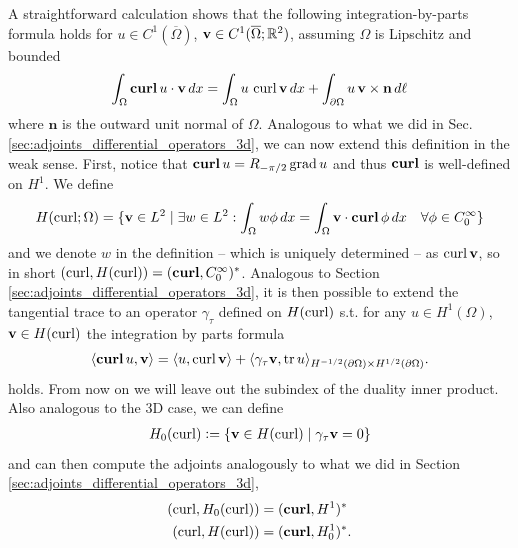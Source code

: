 \documentclass[../master_thesis.tex]{subfiles}
\begin{document}
A straightforward calculation shows that the following integration-by-parts formula 
holds for $u \in C^1(\overline{\Omega})$, $\mathbf{v} \in C^1(\overline{\Omega};\real^2)$,
assuming $\Omega$ is Lipschitz and bounded
\begin{align}
    \int_\Omega \veccurl u \cdot \mathbf{v} \,dx 
    = \int_\Omega u \, \curl \mathbf{v} \, dx + \int_{\partial \Omega} u\, \mathbf{v} \times \mathbf{n} \, d\ell
    \label{eq:2D_integration_by_parts_curl}
\end{align}
where $\mathbf{n}$ is the outward unit normal of $\Omega$.
Analogous to what we did in Sec.\,\ref{sec:adjoints_differential_operators_3d}, 
we can now extend this definition in the weak sense.
First, notice that $\veccurl u = R_{-\pi/2} \grad u$ and thus $\veccurl$ is well-defined 
on $H^1$. We define 
\begin{align*}
    H(\curl;\Omega) = \{ \mathbf{v} \in L^2 \mid \exists  w \in L^2: 
        \int_\Omega w \phi \, dx = \int_\Omega \mathbf{v} \cdot \veccurl \phi \, dx 
        \quad \forall \phi \in C_0^\infty \}
\end{align*}
and we denote $w$ in the definition -- which is uniquely determined -- 
as $\curl \mathbf{v}$, so in short
$(\curl, H(\curl)) = (\veccurl, C_0^\infty)^*$. 
Analogous to Section\,\ref{sec:adjoints_differential_operators_3d}, it is then possible to extend the 
tangential trace to an operator $\gamma_\tau$ defined on $H(\curl)$ s.t. 
for any $u\in H^1(\Omega)$, $\mathbf{v} \in H(\curl)$
the integration by parts formula
\begin{align*}
    \langle \veccurl u, \mathbf{v} \rangle = \langle  u, \curl \mathbf{v} \rangle 
        + \langle \gamma_\tau \mathbf{v} , \tr u \rangle_{H^{-1/2}(\partial \Omega)\times H^{1/2}(\partial \Omega)}.
\end{align*}
holds. From now on we will leave out the subindex of the duality inner product. Also analogous to the 3D case,
we can define 
\begin{align*}
    H_0(\curl) \vcentcolon= \{ \mathbf{v} \in H(\curl) \mid \gamma_\tau \mathbf{v} = 0\}
\end{align*}
and can then compute the adjoints analogously to what we did in Section\,\ref{sec:adjoints_differential_operators_3d},
\begin{align*}
    (\curl, H_0(\curl)) & = (\veccurl, H^1)^* 
    \\ (\curl, H(\curl)) & = (\veccurl, H_0^1)^*.
\end{align*}
\end{document}
